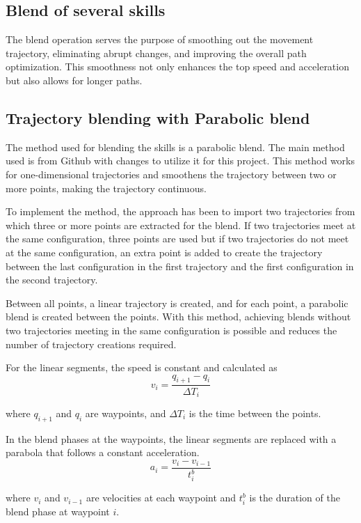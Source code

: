 \documentclass[Setup/main.tex]{subfiles}
\begin{document}
\subsection{Blend of several skills}\label{sec::blend}
The blend operation serves the purpose of smoothing out the movement trajectory, eliminating abrupt changes, and improving the overall path optimization. This smoothness not only enhances the top speed and acceleration but also allows for longer paths.

\subsection{Trajectory blending with Parabolic blend}
The method used for blending the skills is a parabolic blend. The main method used is from Github \cite{para_blend} with changes to utilize it for this project. This method works for one-dimensional trajectories and smoothens the trajectory between two or more points, making the trajectory continuous.

To implement the method, the approach has been to import two trajectories from which three or more points are extracted for the blend. If two trajectories meet at the same configuration, three points are used but if two trajectories do not meet at the same configuration, an extra point is added to create the trajectory between the last configuration in the first trajectory and the first configuration in the second trajectory. 

Between all points, a linear trajectory is created, and for each point, a parabolic blend is created between the points. With this method, achieving blends without two trajectories meeting in the same configuration is possible and reduces the number of trajectory creations required.

For the linear segments, the speed is constant and calculated as
\begin{equation}
    v_i = \frac{q_{i+1} - q_i}{\Delta T_i}
\end{equation}

where $q_{i+1}$ and $q_i$ are waypoints, and $\Delta T_i$ is the time between the points.

In the blend phases at the waypoints, the linear segments are replaced with a parabola that follows a constant acceleration.
\begin{equation}
    a_i = \frac{v_i - v_{i-1}}{t^b_i} 
\end{equation} 

where $v_i$ and $v_{i-1}$ are velocities at each waypoint and $t^b_i$ is the duration of the blend phase at waypoint $i$.
\end{document}
